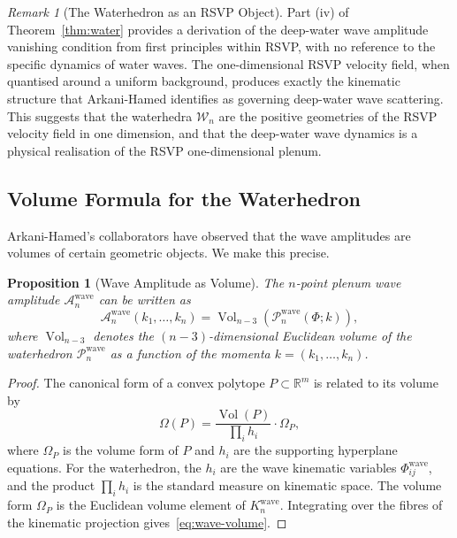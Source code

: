 \documentclass[12pt, oneside]{amsart}
\theoremstyle{plain}
\newtheorem{proposition}[theorem]{Proposition}
\theoremstyle{definition}
\theoremstyle{remark}
\newtheorem{remark}[theorem]{Remark}
\DeclareMathOperator{\Vol}{Vol}
\newcommand{\R}{\mathbb{R}}
\newcommand{\Amp}{\mathcal{A}}
\newcommand{\Water}{\mathcal{W}_n}
\newcommand{\CF}{\Omega}   %
\begin{document}
\begin{remark}[The Waterhedron as an RSVP Object]
Part (iv) of Theorem~\ref{thm:water} provides a derivation of the deep-water wave amplitude vanishing condition from first principles within RSVP, with no reference to the specific dynamics of water waves. The one-dimensional RSVP velocity field, when quantised around a uniform background, produces exactly the kinematic structure that Arkani-Hamed identifies as governing deep-water wave scattering. This suggests that the waterhedra $\Water$ are the positive geometries of the RSVP velocity field in one dimension, and that the deep-water wave dynamics is a physical realisation of the RSVP one-dimensional plenum.
\end{remark}

\subsection{Volume Formula for the Waterhedron}

Arkani-Hamed's collaborators have observed that the wave amplitudes are volumes of certain geometric objects. We make this precise.

\begin{proposition}[Wave Amplitude as Volume]
\label{prop:wave-volume}
The $n$-point plenum wave amplitude $\Amp_n^{\text{wave}}$ can be written as
\begin{equation}
\label{eq:wave-volume}
  \Amp_n^{\text{wave}}(k_1, \ldots, k_n) = \Vol_{n-3}(\mathcal{P}_n^{\text{wave}}(\Phi; k)),
\end{equation}
where $\Vol_{n-3}$ denotes the $(n-3)$-dimensional Euclidean volume of the waterhedron $\mathcal{P}_n^{\text{wave}}$ as a function of the momenta $k = (k_1, \ldots, k_n)$.
\end{proposition}

\begin{proof}
The canonical form of a convex polytope $P \subset \R^m$ is related to its volume by
\[
  \CF(P) = \frac{\Vol(P)}{\prod_i h_i} \cdot \Omega_P,
\]
where $\Omega_P$ is the volume form of $P$ and $h_i$ are the supporting hyperplane equations. For the waterhedron, the $h_i$ are the wave kinematic variables $\Phi_{ij}^{\text{wave}}$, and the product $\prod_i h_i$ is the standard measure on kinematic space. The volume form $\Omega_P$ is the Euclidean volume element of $K_n^{\text{wave}}$. Integrating over the fibres of the kinematic projection gives~\eqref{eq:wave-volume}.
\end{proof}
\end{document}
